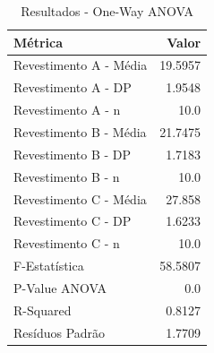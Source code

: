 \begin{table}[H]
\centering
\caption{Resultados - One-Way ANOVA}
\label{tab:resultados_oneway}
\begin{tabular}{|l|r|}
\hline
\textbf{Métrica} & \textbf{Valor} \\
\hline
Revestimento A - Média & 19.5957 \\
Revestimento A - DP & 1.9548 \\
Revestimento A - n & 10.0 \\
Revestimento B - Média & 21.7475 \\
Revestimento B - DP & 1.7183 \\
Revestimento B - n & 10.0 \\
Revestimento C - Média & 27.858 \\
Revestimento C - DP & 1.6233 \\
Revestimento C - n & 10.0 \\
F-Estatística & 58.5807 \\
P-Value ANOVA & 0.0 \\
R-Squared & 0.8127 \\
Resíduos Padrão & 1.7709 \\
\hline
\end{tabular}
\end{table}
